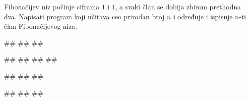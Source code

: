 \begin{Exercise}[label=p1.4_] 
Fibonačijev niz počinje ciframa $1$ i $1$, a svaki član se dobija
zbirom prethodna dva. Napisati program koji učitava ceo prirodan broj
$n$ i određuje i ispisuje $n$-ti član Fibonačijevog niza.

\begin{miditest}
\begin{upotreba}{1}
#\naslovInt#
##
##
\end{upotreba}
\end{miditest}
\begin{miditest}
\begin{upotreba}{2}
#\naslovInt#
##
##
##
\end{upotreba}
\end{miditest}

\begin{miditest}
\begin{upotreba}{3}
#\naslovInt#
##
##
\end{upotreba}
\end{miditest}
\begin{miditest}
\begin{upotreba}{4}
#\naslovInt#
##
##
\end{upotreba}
\end{miditest}
\end{Exercise}
\begin{Answer}[ref=p1.4_]
\end{Answer}


